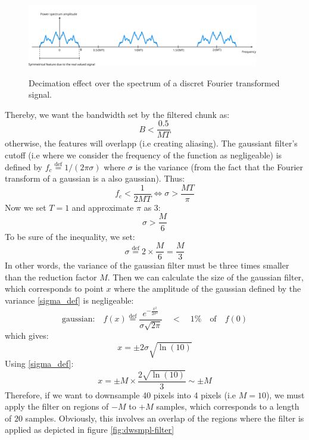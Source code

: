 \documentclass[11pt]{report}
\begin{document}
\begin{figure}[h!]
\caption{Decimation effect over the spectrum of a discret Fourier transformed signal.}
\centering
\includegraphics[width=0.9\textwidth]{dwsmpl-freq}
\label{fig:dwsmpl-freq}
\end{figure}

Thereby, we want the bandwidth set by the filtered chunk as:
\begin{equation}
B < \frac{0.5}{MT}
\end{equation}
otherwise, the features will overlapp (i.e creating aliasing). The gaussiant filter's cutoff (i.e where we consider the frequency of the function as negligeable) is defined by $f_c \stackrel{\text{def}}{=} 1/(2\pi \sigma)$ where $\sigma$ is the variance (from the fact that the Fourier transform of a gaussian is a also gaussian). Thus:
\begin{equation}
f_c < \frac{1}{2MT} \Leftrightarrow \sigma > \frac{MT}{\pi}
\end{equation}
Now we set $T=1$ and approximate $\pi$ as 3:
\begin{equation}
\sigma > \frac{M}{6}
\end{equation}
To be sure of the inequality, we set:
\begin{equation}
\label{sigma_def}
\sigma \stackrel{\text{def}}{=} 2\times\frac{M}{6} = \frac{M}{3}
\end{equation}
In other words, the variance of the gaussian filter must be three times smaller than the reduction factor $M$. Then we can calculate the size of the gaussian filter, which corresponds to point $x$ where the amplitude of the gaussian defined by the variance \eqref{sigma_def} is negligeable:
\begin{equation}
\textrm{gaussian:} \quad f(x) \stackrel{\text{def}}{=} \frac{e^{-\frac{x^2}{2\sigma^2}}}{\sigma\sqrt{2\pi}} \quad < \quad 1\% \quad \textrm{of} \quad f(0)
\end{equation}
which gives:
\begin{equation}
x = \pm 2\sigma\sqrt{\ln(10)}
\end{equation}
Using \eqref{sigma_def}:
\begin{equation}
x = \pm M \times \frac{2\sqrt{\ln(10)}}{3} \sim \pm M
\end{equation}
Therefore, if we want to downsample 40 pixels into 4 pixels (i.e $M = 10$), we must apply the filter on regions of $-M$ to $+M$ samples, which corresponds to a length of $20$ samples. Obviously, this involves an overlap of the regions where the filter is applied as depicted in figure \ref{fig:dwsmpl-filter}
\end{document}
